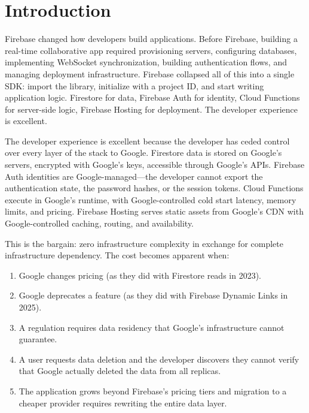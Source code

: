 \section{Introduction}
\label{sec:intro}

Firebase changed how developers build applications. Before Firebase, building
a real-time collaborative app required provisioning servers, configuring
databases, implementing WebSocket synchronization, building authentication
flows, and managing deployment infrastructure. Firebase collapsed all of
this into a single SDK: import the library, initialize with a project ID,
and start writing application logic. Firestore for data, Firebase Auth for
identity, Cloud Functions for server-side logic, Firebase Hosting for
deployment. The developer experience is excellent.

The developer experience is excellent because the developer has ceded
control over every layer of the stack to Google. Firestore data is stored
on Google's servers, encrypted with Google's keys, accessible through
Google's APIs. Firebase Auth identities are Google-managed---the developer
cannot export the authentication state, the password hashes, or the session
tokens. Cloud Functions execute in Google's runtime, with Google-controlled
cold start latency, memory limits, and pricing. Firebase Hosting serves
static assets from Google's CDN with Google-controlled caching, routing,
and availability.

This is the bargain: zero infrastructure complexity in exchange for
complete infrastructure dependency. The cost becomes apparent when:

\begin{enumerate}[label=(\roman*)]
    \item Google changes pricing (as they did with Firestore reads in 2023).
    \item Google deprecates a feature (as they did with Firebase Dynamic Links in 2025).
    \item A regulation requires data residency that Google's infrastructure
    cannot guarantee.
    \item A user requests data deletion and the developer discovers they
    cannot verify that Google actually deleted the data from all replicas.
    \item The application grows beyond Firebase's pricing tiers and
    migration to a cheaper provider requires rewriting the entire data layer.
\end{enumerate}

